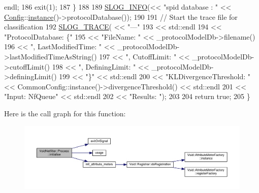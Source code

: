 \begin{DoxyCode}
      endl;
186         exit(1);
187     \}
188 
189     \hyperlink{_logger_8h_a119c1c29ba35a8db38e2358e41167282}{SLOG\_INFO}(<< "spid database : " << \hyperlink{class_vsid_netfilter_1_1_config}{Config}::\hyperlink{class_vsid_netfilter_1_1_process_a56a4c6294170fa3abf87a7a214ff4cea}{instance}()->protocolDatabase());
190 
191     \textcolor{comment}{// Start the trace file for classification}
192     \hyperlink{_logger_8h_a92056d6f812b14acf33d9e27b9b1f157}{SLOG\_TRACE}( << "---"
193                 << std::endl
194                 << "ProtocolDatabase: \{\textcolor{stringliteral}{" }
195 \textcolor{stringliteral}{                << "}FileName: \textcolor{stringliteral}{" << \_protocolModelDb->filename() }
196 \textcolor{stringliteral}{                << "}, LastModifiedTime: \textcolor{stringliteral}{" << \_protocolModelDb->lastModifiedTimeAsString()}
197 \textcolor{stringliteral}{                << "}, CutoffLimit: \textcolor{stringliteral}{" << \_protocolModelDb->cutoffLimit()}
198 \textcolor{stringliteral}{                << "}, DefiningLimit: \textcolor{stringliteral}{" << \_protocolModelDb->definingLimit()}
199 \textcolor{stringliteral}{                << "}\}\textcolor{stringliteral}{" << std::endl}
200 \textcolor{stringliteral}{                << "}KLDivergenceThreshold: \textcolor{stringliteral}{" << CommonConfig::instance()->divergenceThreshold() <<
       std::endl}
201 \textcolor{stringliteral}{                << "}Input: NfQueue\textcolor{stringliteral}{" << std::endl}
202 \textcolor{stringliteral}{                << "}Results: \textcolor{stringliteral}{");}
203 \textcolor{stringliteral}{}
204 \textcolor{stringliteral}{    return true;}
205 \textcolor{stringliteral}{\}}
\end{DoxyCode}


Here is the call graph for this function\-:
\nopagebreak
\begin{figure}[H]
\begin{center}
\leavevmode
\includegraphics[width=350pt]{class_vsid_netfilter_1_1_process_add484e8839f34ceb0287c50795a20393_cgraph}
\end{center}
\end{figure}


